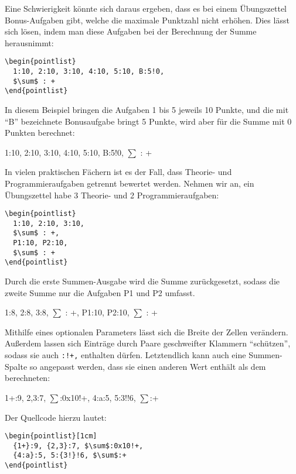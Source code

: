 \documentclass[parskip=half-,DIV14,10pt]{scrartcl}
\begin{document}
Eine Schwierigkeit könnte sich daraus ergeben, dass es bei einem
Übungszettel Bonus-Aufgaben gibt, welche die maximale Punktzahl nicht
erhöhen.  Dies lässt sich lösen, indem man diese Aufgaben bei der
Berechnung der Summe herausnimmt:
\begin{lstlisting}
\begin{pointlist}
  1:10, 2:10, 3:10, 4:10, 5:10, B:5!0,
  $\sum$ : +
\end{pointlist}
\end{lstlisting}
In diesem Beispiel bringen die Aufgaben 1 bis 5 jeweils 10 Punkte, und
die mit "`B"' bezeichnete Bonusaufgabe bringt 5 Punkte, wird aber für
die Summe mit 0 Punkten berechnet:
\begin{center}
\begin{pointlist}
  1:10, 2:10, 3:10, 4:10, 5:10, B:5!0,
  $\sum$ : +
\end{pointlist}
\end{center}

In vielen praktischen Fächern ist es der Fall, dass Theorie- und
Programmieraufgaben getrennt bewertet werden.  Nehmen wir an, ein
Übungszettel habe 3 Theorie- und 2 Programmieraufgaben:
\begin{lstlisting}
\begin{pointlist}
  1:10, 2:10, 3:10,
  $\sum$ : +,
  P1:10, P2:10,
  $\sum$ : +
\end{pointlist}
\end{lstlisting}
Durch die erste Summen-Ausgabe wird die Summe zurückgesetzt, sodass
die zweite Summe nur die Aufgaben P1 und P2 umfasst.
\begin{center}
\begin{pointlist}
  1:8, 2:8, 3:8,
  $\sum$ : +,
  P1:10, P2:10,
  $\sum$ : +
\end{pointlist}
\end{center}

Mithilfe eines optionalen Parameters lässt sich die Breite der Zellen
verändern.  Außerdem lassen sich Einträge durch Paare geschweifter
Klammern "`schützen"', sodass sie auch \lstinline|:!+,| enthalten
dürfen.  Letztendlich kann auch eine Summen-Spalte so angepasst
werden, dass sie einen anderen Wert enthält als dem berechneten:
\begin{center}
\begin{pointlist}[1cm]
  {1+}:9, {2,3}:7, $\sum$:0x10!+,
  {4:a}:5, 5:{3!}!6, $\sum$:+
\end{pointlist}
\end{center}
Der Quellcode hierzu lautet:
\begin{lstlisting}
\begin{pointlist}[1cm]
  {1+}:9, {2,3}:7, $\sum$:0x10!+,
  {4:a}:5, 5:{3!}!6, $\sum$:+
\end{pointlist}
\end{lstlisting}
\end{document}
